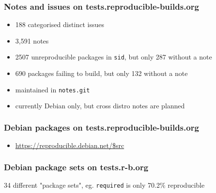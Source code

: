\documentclass[14pt]{beamer}
\begin{document}
\begin{frame}
 \frametitle{Notes and issues on tests.reproducible-builds.org}

 \begin{itemize}
  \item { 188 categorised distinct issues }
  \item { 3,591 notes }
  \item<2-4> { 2507 unreproducible packages in \texttt{sid}, but only 287 without a 
  note }
  \item<2-4> { 690 packages failing to build, but only 132 without a note }
  \item<3-4> { maintained in \texttt{notes.git} }
  \item<4> { currently Debian only, but cross distro notes are planned}
 \end{itemize}
\end{frame}



\begin{frame}
 \frametitle{Debian packages on tests.reproducible-builds.org}
 \begin{itemize}
  \item \url {https://reproducible.debian.net/$src}
 \end{itemize}
\end{frame}

\begin{frame}
 \frametitle{Debian package sets on tests.r-b.org}
 \begin{center}
  \footnotesize{34 different "package sets", eg. \texttt{required} is only
  70.2\% reproducible}
  \vfill
 \end{center}
\end{frame}
\end{document}
